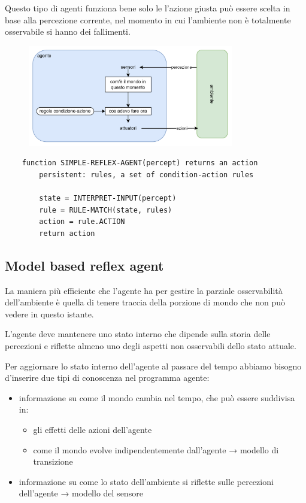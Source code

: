 Questo tipo di agenti funziona bene solo le l'azione giusta può essere scelta
in base alla percezione corrente, nel momento in cui l'ambiente non è
totalmente osservabile si hanno dei fallimenti.

\begin{figure}[H]
	\centering
	\includegraphics[width=0.8\textwidth]{capitoli/agenti-intelligenti/imgs/simple-reflex.png}
\end{figure}

\begin{lstlisting}
	function SIMPLE-REFLEX-AGENT(percept) returns an action
		persistent: rules, a set of condition-action rules
		
		state = INTERPRET-INPUT(percept)
		rule = RULE-MATCH(state, rules)
		action = rule.ACTION
		return action
\end{lstlisting}

\subsection{\foreignlanguage{english}{Model based reflex agent}}

La maniera più efficiente che l'agente ha per gestire la parziale osservabilità dell'ambiente è quella di tenere traccia della porzione di mondo che non può vedere in questo istante.

L'agente deve mantenere uno stato interno che dipende sulla storia delle percezioni e riflette almeno uno degli aspetti non osservabili dello stato attuale.

Per aggiornare lo stato interno dell'agente al passare del tempo abbiamo bisogno d'inserire due tipi di conoscenza nel programma agente:

\begin{itemize}
	\item informazione su come il mondo cambia nel tempo, che può essere suddivisa in:
	\begin{itemize}
		\item gli effetti delle azioni dell'agente 
		\item come il mondo evolve indipendentemente dall'agente → modello di transizione
	\end{itemize}
	\item informazione su come lo stato dell'ambiente si riflette sulle percezioni dell'agente → modello del sensore
\end{itemize}

